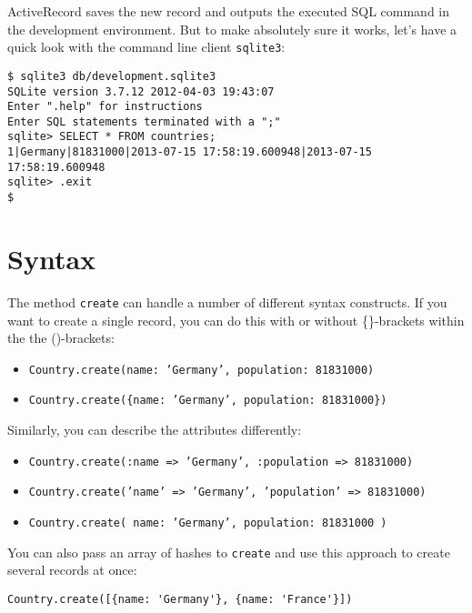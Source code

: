 \documentclass[a4paper]{book}
\begin{document}
ActiveRecord saves the new record and outputs the executed SQL command in the development environment. But to make absolutely sure it works, let's have a quick look with the command line client \texttt{sqlite3}:

\begin{shaded}\begin{verbatim}
$ sqlite3 db/development.sqlite3
SQLite version 3.7.12 2012-04-03 19:43:07
Enter ".help" for instructions
Enter SQL statements terminated with a ";"
sqlite> SELECT * FROM countries;
1|Germany|81831000|2013-07-15 17:58:19.600948|2013-07-15 17:58:19.600948
sqlite> .exit
$
\end{verbatim}\end{shaded}

\section{Syntax}\label{syntax}

The method \texttt{create} can handle a number of different syntax constructs. If you want to create a single record, you can do this with or without \{\}-brackets within the the ()-brackets:

\begin{itemize}
\itemsep1pt\parskip0pt
\item
  \texttt{Country.create(name: 'Germany', population:             81831000)}
\item
  \texttt{Country.create(\{name: 'Germany', population:             81831000\})}
\end{itemize}

Similarly, you can describe the attributes differently:

\begin{itemize}
\itemsep1pt\parskip0pt
\item
  \texttt{Country.create(:name =\textgreater{} 'Germany', :population             =\textgreater{} 81831000)}
\item
  \texttt{Country.create('name' =\textgreater{} 'Germany', 'population'             =\textgreater{} 81831000)}
\item
  \texttt{Country.create( name: 'Germany', population: 81831000             )}
\end{itemize}

You can also pass an array of hashes to \texttt{create} and use this approach to create several records at once:

\begin{shaded}\begin{verbatim}
Country.create([{name: 'Germany'}, {name: 'France'}])
\end{verbatim}\end{shaded}
\end{document}
